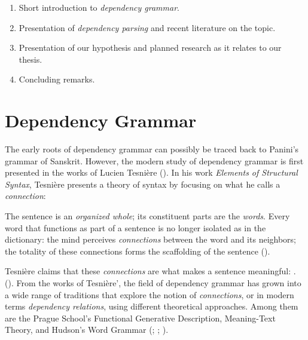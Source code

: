 \documentclass[10pt]{article}
\begin{document}
\begin{enumerate}
\item Short introduction to \textit{dependency grammar}.
\item Presentation of \textit{dependency parsing} and recent literature on the topic.
\item Presentation of our hypothesis and planned research as it relates to our thesis.
\item Concluding remarks.
\end{enumerate}

\section{Dependency Grammar}

The early roots of dependency grammar can possibly be traced back to Panini's grammar of Sanskrit. However, the modern study of dependency grammar is first presented in the works of Lucien Tesni\`ere (\cite{tesniere2015elements}). In his work \textit{Elements of Structural Syntax}, Tesni\`ere presents a theory of syntax by focusing on what he calls a \textit{connection}: 

\begin{displayquote}
The sentence is an \textit{organized whole}; its constituent parts are the \textit{words}. Every word that functions as part of a sentence is no longer isolated as in the dictionary: the mind perceives \textit{connections} between the word and its neighbors; the totality of these connections forms the scaffolding of the sentence (\cite{tesniere2015elements}).
\end{displayquote}

Tesni\`ere claims that these \textit{connections} are what makes a sentence meaningful: . (\cite{tesniere2015elements}). From the works of Tesni\`ere', the field of dependency grammar has grown into a wide range of traditions that explore the notion of \textit{connections}, or in modern terms \textit{dependency relations}, using different theoretical approaches. Among them are the Prague School's Functional Generative Description, Meaning-Text Theory, and Hudson's Word Grammar (\cite{sgall1986meaning}; \cite{melcuk}; \cite{hudson1990english}). 
\end{document}
